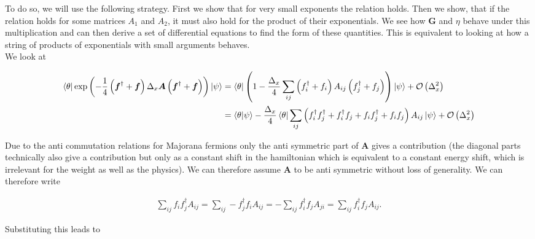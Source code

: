 \documentclass{article}
\begin{document}
To do so, we will use the following strategy. First we show that for very small exponents the relation holds. Then we show, that if the relation holds for some matrices $A_1$ and $A_2$, it must also hold for the product of their exponentials. We see how $\boldsymbol{G}$ and $\eta$ behave under this multiplication and can then derive a set of differential equations to find the form of these quantities. This is equivalent to looking at how a string of products of exponentials with small arguments behaves.\\
We look at


\begin{align}
	\bra{\theta} \exp \left( -\frac{1}{4}\left(\boldsymbol{f}^{\dagger}+\boldsymbol{f} \right)\Delta_{x}\boldsymbol{A}\left( \boldsymbol{f}^{\dagger}+\boldsymbol{f}\right)  \right)\ket{\psi} &= \bra{\theta}\left( 1 - \frac{\Delta_{x} }{4} \sum_{ij}^{ }\left(f^{\dagger}_i+ f_i\right)A_{ij}\left(f^{\dagger}_{j} + f_{j}  \right)\right) \ket{\psi} + \mathcal{O}\left(\Delta_{x}^{2} \right)   \nonumber \\
	&= \braket{\theta|\psi} - \frac{\Delta_{x} }{4}\bra{\theta}\sum_{ij}^{ }\left(f_{i}^{\dagger}f_{j}^{\dagger} + f_{i}^{\dagger}f_{j} + f_{i}f_{j}^{\dagger} + f_{i}f_{j}  \right)A_{ij} \ket{\psi} + \mathcal{O} \left(\Delta_{x}^{2} \right) 
\end{align} 

Due to the anti commutation relations for Majorana fermions only the anti symmetric part of $\boldsymbol{A}$ gives a contribution (the diagonal parts technically also give a contribution but only as a constant shift in the hamiltonian which is equivalent to a constant energy shift, which is irrelevant for the weight as well as the physics). We can therefore assume $\boldsymbol{A}$ to be anti symmetric without loss of generality. We can therefore write

\begin{align}
	\sum_{ij}^{ } f_{i}f_{j}^{\dagger}A_{ij}= \sum_{ij}^{ } -f_{j}^{\dagger}f_{i}A_{ij}=-\sum_{ij}^{ } f_{i}^{\dagger}f_{j}A_{ji}=\sum_{ij}^{ } f_{i}^{\dagger}f_{j}A_{ij}.
\end{align}

Substituting this leads to
\end{document}
